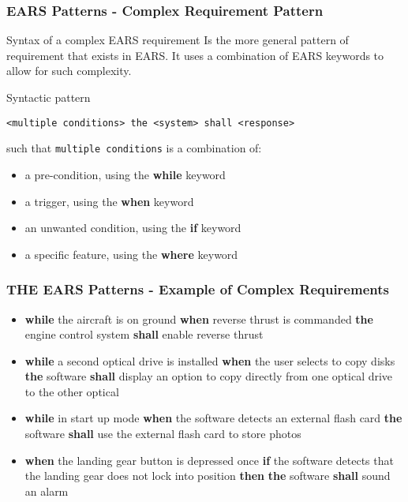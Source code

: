 \documentclass[aspectratio=169]{beamer}
\newcommand{\earsg}[4]{{\bf \color{mygreen}while} {#1} {\bf \color{mygreen}when} {#2} %
                      {\bf \color{mypurple}the} {#3} {\bf \color{mypurple}shall} {#4}}
\newcommand{\earsw}[3]{{\bf \color{mygreen}if} {#1} {\bf \color{mygreen}then} {\bf \color{mypurple}the} {#2} {\bf \color{mypurple}shall} {#3}}
\begin{document}
%
%
\begin{frame}[fragile]
  \frametitle{EARS Patterns - Complex Requirement Pattern}
  \begin{block}{Syntax of a complex EARS requirement}
    Is the more general pattern of requirement that exists in EARS. It uses a combination of EARS keywords to allow for such complexity.
  \end{block}
  \begin{block}{Syntactic pattern}
    \begin{lstlisting}[language=EARS]
    <multiple conditions> the <system> shall <response>  
    \end{lstlisting}
    such that {\tt multiple conditions} is a combination of:
    \begin{itemize}
      \item a pre-condition, using the {\bf \color{mygreen} while} keyword
      \item a trigger, using the {\bf \color{mygreen} when} keyword
      \item an unwanted condition, using the {\bf \color{mygreen} if} keyword
      \item a specific feature, using the {\bf \color{mygreen} where} keyword
    \end{itemize}
  \end{block}
\end{frame}
%
\begin{frame}[fragile]
 \frametitle{THE EARS Patterns - Example of Complex Requirements}
  \begin{example}
  \begin{itemize}
  \item \earsg{the aircraft is on ground}{reverse thrust is commanded}{engine control system}{enable reverse thrust}
  \item \earsg{a second optical drive is installed}{the user selects to copy disks}{software}{display an option to copy directly from one optical drive to the other optical}
  \item \earsg{in start up mode}{the software detects an external flash card}{software}{use the external
flash card to store photos}
  \item {\bf \color{mygreen}when} the landing gear button is depressed once \earsw{the software detects that the landing gear does not lock into position}{software}{sound an alarm}
  \end{itemize}
  \end{example}
\end{frame}
\end{document}
